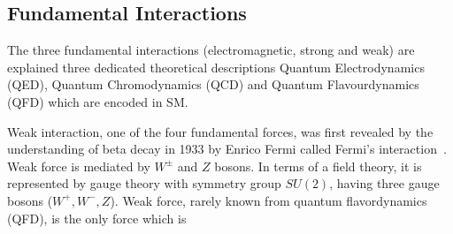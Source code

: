 \subsection{Fundamental Interactions}\label{fundamentalforces}
The three fundamental interactions (electromagnetic, strong and weak) are explained three dedicated
theoretical descriptions Quantum Electrodynamics (QED), Quantum Chromodynamics (QCD) and  Quantum Flavourdynamics (QFD) which are 
encoded in SM. 
\par Weak interaction, one of the four fundamental forces, was first revealed by the understanding of beta decay in 1933 by Enrico Fermi called Fermi's 
interaction~\cite{Referencea}. Weak force is mediated by $W^\pm$ and $Z$ bosons. In terms of a field theory, it is represented by gauge theory with symmetry group $SU(2)$, 
having three gauge bosons ($W^+, W^-, Z$). Weak force, rarely known from quantum flavordynamics (QFD), is the only force which is 
